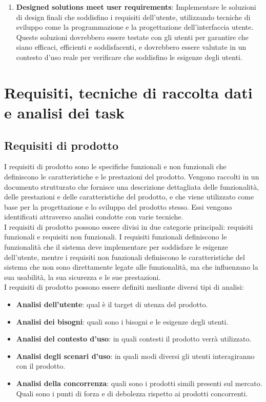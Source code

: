\documentclass{report}
\begin{document}
\begin{enumerate}
		\item \textbf{Designed solutions meet user requirements}: Implementare le soluzioni di design finali che soddisfino i requisiti dell'utente, utilizzando tecniche di sviluppo come la programmazione e la progettazione dell'interfaccia utente. Queste soluzioni dovrebbero essere testate con gli utenti per garantire che siano efficaci, efficienti e soddisfacenti, e dovrebbero essere valutate in un contesto d'uso reale per verificare che soddisfino le esigenze degli utenti.
	\end{enumerate}

	\chapter{Requisiti, tecniche di raccolta dati e analisi dei task}
	\section{Requisiti di prodotto}
	I requisiti di prodotto sono le specifiche funzionali e non funzionali che definiscono le caratteristiche e le prestazioni del prodotto. Vengono raccolti in un documento strutturato che fornisce una descrizione dettagliata delle funzionalità, delle prestazioni e delle caratteristiche del prodotto, e che viene utilizzato come base per la progettazione e lo sviluppo del prodotto stesso. Essi vengono identificati attraverso analisi condotte con varie tecniche. 
	\vspace{\baselineskip}\\
	I requisiti di prodotto possono essere divisi in due categorie principali: requisiti funzionali e requisiti non funzionali. I requisiti funzionali definiscono le funzionalità che il sistema deve implementare per soddisfare le esigenze dell'utente, mentre i requisiti non funzionali definiscono le caratteristiche del sistema che non sono direttamente legate alle funzionalità, ma che influenzano la sua usabilità, la sua sicurezza e le sue prestazioni.
	\vspace{\baselineskip}\\
	I requisiti di prodotto possono essere definiti mediante diversi tipi di analisi:
	\begin{itemize}
		\item \textbf{Analisi dell'utente}: qual è il target di utenza del prodotto.
		\item \textbf{Analisi dei bisogni}: quali sono i bisogni e le esigenze degli utenti.
		\item \textbf{Analisi del contesto d'uso}: in quali contesti il prodotto verrà utilizzato.
		\item \textbf{Analisi degli scenari d'uso}: in quali modi diversi gli utenti interagiranno con il prodotto.
		\item \textbf{Analisi della concorrenza}: quali sono i prodotti simili presenti sul mercato. Quali sono i punti di forza e di debolezza rispetto ai prodotti concorrenti.
	\end{itemize}
\end{document}
